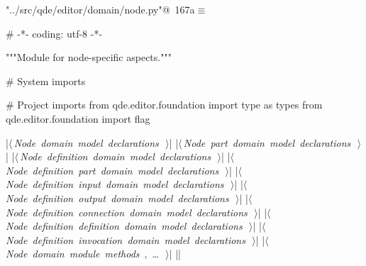 \documentclass[%
    a4paper,    %
    justified,  %
    nobib,      %
    openany     %
]{tufte-book}
\begin{document}
\begin{flushleft} \small
\begin{minipage}{\linewidth}\label{scrap187}\raggedright\small
{} \verb@"../src/qde/editor/domain/node.py"@\nobreak\ {\footnotesize {167a}}$\equiv$
\vspace{-1ex}
\begin{pythoncode}
# -*- coding: utf-8 -*-

"""Module for node-specific aspects."""

# System imports

# Project imports
from qde.editor.foundation import type as types
from qde.editor.foundation import flag

|\hbox{$\langle\,${\itshape Node domain model declarations}\nobreak\ {\footnotesize {}}$\,\rangle$}|
|\hbox{$\langle\,${\itshape Node part domain model declarations}\nobreak\ {\footnotesize {}}$\,\rangle$}|
|\hbox{$\langle\,${\itshape Node definition domain model declarations}\nobreak\ {\footnotesize {}}$\,\rangle$}|
|\hbox{$\langle\,${\itshape Node definition part domain model declarations}\nobreak\ {\footnotesize {}}$\,\rangle$}|
|\hbox{$\langle\,${\itshape Node definition input domain model declarations}\nobreak\ {\footnotesize {}}$\,\rangle$}|
|\hbox{$\langle\,${\itshape Node definition output domain model declarations}\nobreak\ {\footnotesize {}}$\,\rangle$}|
|\hbox{$\langle\,${\itshape Node definition connection domain model declarations}\nobreak\ {\footnotesize {}}$\,\rangle$}|
|\hbox{$\langle\,${\itshape Node definition definition domain model declarations}\nobreak\ {\footnotesize {}}$\,\rangle$}|
|\hbox{$\langle\,${\itshape Node definition invocation domain model declarations}\nobreak\ {\footnotesize {}}$\,\rangle$}|
|\hbox{$\langle\,${\itshape Node domain module methods}\nobreak\ {\footnotesize {}, \ldots\ }$\,\rangle$}|
|\NWsep|
\end{pythoncode}
\vspace{1.5ex}
\footnotesize
\begin{list}{}{\setlength{\itemsep}{-\parsep}\setlength{\itemindent}{-\leftmargin}}

\item{}
\end{list}
\end{minipage}\vspace{4ex}
\end{flushleft}
\end{document}
